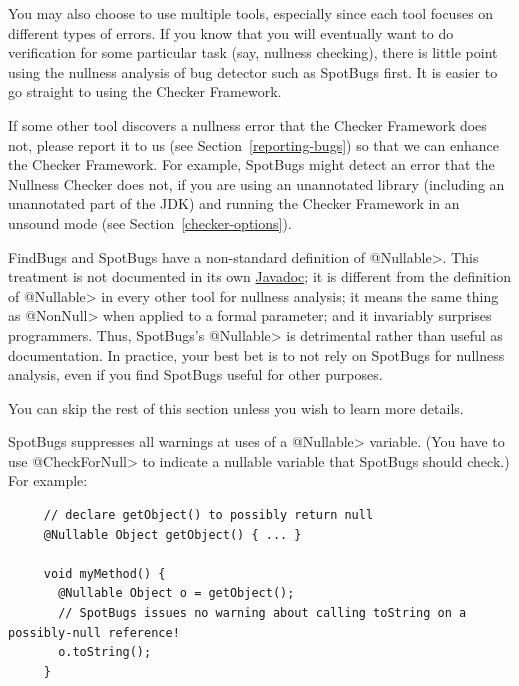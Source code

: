 You may also choose to use multiple tools, especially since each tool
focuses on different types of errors.  If you know that you will eventually
want to do verification for some particular task (say, nullness checking),
there is little point using the nullness analysis of bug detector such as
SpotBugs first.  It is easier to go straight to using the
Checker Framework.

If some other tool discovers a nullness error that the Checker
Framework does not, please report it to us (see
Section~\ref{reporting-bugs}) so that we can enhance the Checker Framework.
For example, SpotBugs might detect an error that the Nullness Checker does
not, if you are using an unannotated library (including an unannotated
part of the JDK) and running the Checker Framework in an unsound mode (see
Section~\ref{checker-options}).



FindBugs and SpotBugs have a non-standard definition of
\<@Nullable>.  This treatment is not documented in its own
\href{https://www.javadoc.io/doc/com.github.spotbugs/spotbugs-annotations/latest/edu/umd/cs/findbugs/annotations/Nullable.html}{Javadoc};
it is different from the definition of \<@Nullable> in every other tool for
nullness analysis; it means the same thing as \<@NonNull> when applied to a
formal parameter; and it invariably surprises programmers.  Thus, SpotBugs's
\<@Nullable> is detrimental rather than useful as documentation.
In practice, your best bet is to not rely on SpotBugs for nullness analysis,
even if you find SpotBugs useful for other purposes.

You can skip the rest of this section unless you wish to learn more details.

SpotBugs suppresses all warnings at uses of a \<@Nullable> variable.
(You have to use \<@CheckForNull> to
indicate a nullable variable that SpotBugs should check.)  For example:

\begin{Verbatim}
     // declare getObject() to possibly return null
     @Nullable Object getObject() { ... }

     void myMethod() {
       @Nullable Object o = getObject();
       // SpotBugs issues no warning about calling toString on a possibly-null reference!
       o.toString();
     }
\end{Verbatim}


